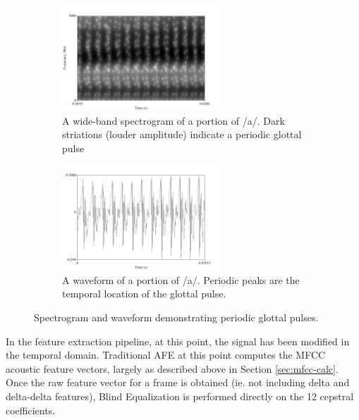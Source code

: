 \begin{figure}[H!]
\centering
\begin{subfigure}{0.75\textwidth}
\centering
\includegraphics[width=0.65\textwidth]{figure/glot-spect.png}
\caption{A wide-band spectrogram of a portion of /a/. Dark \DIFdelbeginFL {}\DIFdelendFL \DIFaddbeginFL {}\DIFaddendFL striations (louder amplitude) indicate a periodic glottal pulse}\label{fig:glot-spect}
\end{subfigure}
\begin{subfigure}{0.75\textwidth}
\centering
\includegraphics[width=0.65\textwidth]{figure/glot-wav.png}
\caption{A waveform of a portion of /a/.  Periodic peaks are the temporal location of the glottal pulse.}\label{fig:glot-wav}
\end{subfigure}
\caption{Spectrogram and waveform demonstrating periodic glottal pulses.}\label{fig:glot-puls}
\end{figure}

In the feature extraction pipeline, at this point, the signal has been modified in the temporal domain.  Traditional AFE at this point computes the MFCC acoustic feature vectors, largely as described above in Section \ref{sec:mfcc-calc}.  Once the raw feature vector for a frame is obtained (ie. not including delta and delta-delta features), Blind Equalization is performed directly on the 12 cepstral coefficients.

